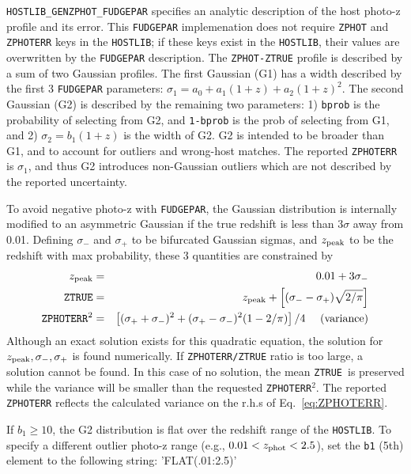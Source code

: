 \documentclass[12pt]{article}
\newcommand{\unc}{uncertainty}
\newcommand{\Zphot}{z_{\rm phot}}
\newcommand{\ztrue}{{\tt ZTRUE}}
\begin{document}
{{\tt HOSTLIB\_GENZPHOT\_FUDGEPAR} specifies an analytic description
of the host photo-z profile and its error.
This {\tt FUDGEPAR} implemenation does not require
{\tt ZPHOT} and {\tt ZPHOTERR} keys in the {\tt HOSTLIB}; 
if these keys exist in the {\tt HOSTLIB}, 
their values are overwritten by the
{\tt FUDGEPAR} description. 
The {\tt ZPHOT-ZTRUE} profile is described by a sum of two 
Gaussian profiles. The first Gaussian (G1) has a width described 
by the first 3 {\tt FUDGEPAR} parameters:
$\sigma_1 = a_0 + a_1(1+z) + a_2(1+z)^2$. 
The second Gaussian (G2) is described by the remaining two parameters:
1) {\tt bprob} is the probability of selecting from G2,
and {\tt 1-bprob} is the prob of selecting from G1,
and 2) $\sigma_2 = b_1(1+z)$ is the width of G2.
G2 is intended to be broader than G1, 
and to account for outliers and wrong-host matches.
The reported {\tt ZPHOTERR} is $\sigma_1$, and thus G2
introduces non-Gaussian outliers which are not described
by the reported \unc.

\newcommand{\sigplus}{\sigma_{+}}
\newcommand{\sigminus}{\sigma_{-}}
\newcommand{\zpeak}{z_{\rm peak}}
To avoid negative photo-z with {\tt FUDGEPAR}, 
the Gaussian distribution is internally modified to an asymmetric
Gaussian if the true redshift is less than $3\sigma$ away from 0.01.
Defining $\sigminus$ and $\sigplus$ to be bifurcated Gaussian sigmas,
and $\zpeak$ to be the redshift with max probability,
these 3 quantities are constrained by
%
\begin{eqnarray}
  \zpeak      &  = & 0.01 + 3\sigminus \\
%
  {\tt ZTRUE} &  = & \zpeak + 
      \left[ (\sigminus - \sigplus)\sqrt{2/\pi}\right] \\
%
  {\tt ZPHOTERR}^2 & = & 
   \left[ (\sigplus+\sigminus)^2 + 
          (\sigplus-\sigminus)^2 (1-2/\pi) \right]/4  
    ~~~~{\rm (variance)} \label{eq:ZPHOTERR}
\end{eqnarray}
%
Although an exact solution exists for this quadratic equation,
the solution for $\zpeak,\sigminus,\sigplus$ is found numerically.
If {\tt ZPHOTERR/ZTRUE} ratio is too large, a solution cannot be found.
In this case of no solution, the mean \ztrue\ is preserved while 
the variance will be smaller than the requested {\tt ZPHOTERR}$^2$.
The reported {\tt ZPHOTERR} reflects the calculated variance on
the r.h.s of Eq.~\ref{eq:ZPHOTERR}.

If $b_1 \ge 10$, the G2 distribution is flat over
the redshift range of the {\tt HOSTLIB}. 
To specify a different outlier photo-z range (e.g., $0.01 < \Zphot < 2.5$), 
set the {\tt b1} (5th) 
element to the following string: 'FLAT(.01:2.5)'


}
\end{document}

